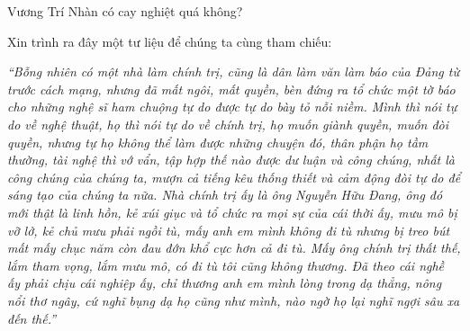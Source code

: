 \documentclass[../main.tex]{subfiles}
\begin{document}
\begin{multicols}{2}
Vương Trí Nhàn có cay nghiệt quá không? 
 
Xin trình ra đây một tư liệu để chúng ta cùng tham chiếu: 
 
\textit{“Bỗng nhiên có một nhà làm chính trị, cũng là dân làm văn làm báo của Đảng từ trước cách mạng, nhưng đã mất ngôi, mất quyền, bèn đứng ra tổ chức một tờ báo cho những nghệ sĩ ham chuộng tự do được tự do bày tỏ nỗi niềm. Mình thì nói tự do về nghệ thuật, họ thì nói tự do về chính trị, họ muốn giành quyền, muốn đòi quyền, nhưng tự họ không thể làm được những chuyện đó, thân phận họ tầm thường, tài nghệ thì vớ vẩn, tập hợp thế nào được dư luận và công chúng, nhất là công chúng của chúng ta, mượn cả tiếng kêu thống thiết và cảm động đòi tự do để sáng tạo của chúng ta nữa. Nhà chính trị ấy là ông Nguyễn Hữu Đang, ông đó mới thật là linh hồn, kẻ xúi giục và tổ chức ra mọi sự của cái thời ấy, mưu mô bị vỡ lở, kẻ chủ mưu phải ngồi tù, mấy anh em mình không đi tù nhưng bị treo bút mất mấy chục năm còn đau đớn khổ cực hơn cả đi tù. Mấy ông chính trị thất thế, lắm tham vọng, lắm mưu mô, có đi tù tôi cũng không thương. Đã theo cái nghề ấy phải chịu cái nghiệp ấy, chỉ thương anh em mình lòng trong dạ thẳng, nông nổi thơ ngây, cứ nghĩ bụng dạ họ cũng như mình, nào ngờ họ lại nghĩ ngợi sâu xa đến thế.”} 
 

\end{multicols}
\end{document}
